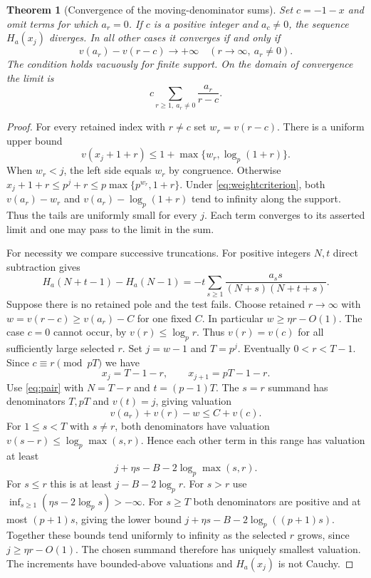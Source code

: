 \documentclass[11pt]{article}
\newtheorem{theorem}{Theorem}[section]
\begin{document}
\begin{theorem}[Convergence of the moving-denominator sums]\label{th:aux}
Set $c=-1-x$ and omit terms for which $a_r=0$. If $c$ is a positive
integer and $a_c\ne0$, the sequence $H_a(x_j)$ diverges.
In all other cases it converges if and only if
\begin{equation}\label{eq:weightcriterion}
              v(a_r)-v(r-c)\longrightarrow+\infty
              \quad(r\longrightarrow\infty,\ a_r\ne0).
\end{equation}
The condition holds vacuously for finite support. On the domain of
convergence the limit is
\[
                 c\sum_{r\ge1,\ a_r\ne0}\frac{a_r}{r-c}.
\]
\end{theorem}
\begin{proof}
For every retained index with $r\ne c$ set $w_r=v(r-c)$. There is a uniform upper bound
\begin{equation}\label{eq:denom}
                 v(x_j+1+r)\le 1+\max\{w_r,\log_p(1+r)\}.
\end{equation}
When $w_r<j$, the left side equals $w_r$ by congruence. Otherwise $x_j+1+r\le p^j+r\le p\max\{p^{w_r},1+r\}$. Under \eqref{eq:weightcriterion}, both $v(a_r)-w_r$ and $v(a_r)-\log_p(1+r)$ tend to infinity along the support. Thus the tails are uniformly small for every $j$. Each term converges to its asserted limit and one may pass to the limit in the sum.

For necessity we compare successive truncations. For positive integers $N,t$ direct subtraction gives
\begin{equation}\label{eq:pair}
 H_a(N+t-1)-H_a(N-1)=-t\sum_{s\ge1}\frac{a_s s}{(N+s)(N+t+s)}.
\end{equation}
Suppose there is no retained pole and the test fails. Choose retained
$r\to\infty$ with $w=v(r-c)\ge v(a_r)-C$ for one fixed $C$. In particular $w\ge\eta r-O(1)$. The case $c=0$ cannot occur, by $v(r)\le\log_p r$. Thus $v(r)=v(c)$ for all sufficiently large selected $r$.
Set $j=w-1$ and $T=p^j$. Eventually $0<r<T-1$. Since $c\equiv r\pmod{pT}$ we have
\[
               x_j=T-1-r,\qquad x_{j+1}=pT-1-r .
\]
Use \eqref{eq:pair} with $N=T-r$ and $t=(p-1)T$. The $s=r$ summand has denominators $T,pT$ and $v(t)=j$, giving valuation
\begin{equation}\label{eq:badterm}
              v(a_r)+v(r)-w\le C+v(c).
\end{equation}
For $1\le s<T$ with $s\ne r$, both denominators have valuation
$v(s-r)\le\log_p\max(s,r)$. Hence each other term in this range has valuation at least
\[
                 j+\eta s-B-2\log_p\max(s,r).
\]
For $s\le r$ this is at least $j-B-2\log_p r$. For $s>r$ use
$\inf_{s\ge1}(\eta s-2\log_p s)>-\infty$. For $s\ge T$ both
denominators are positive and at most $(p+1)s$, giving the lower bound
$j+\eta s-B-2\log_p((p+1)s)$. Together these bounds tend uniformly to
infinity as the selected $r$ grows, since $j\ge\eta r-O(1)$.
The chosen summand therefore has uniquely smallest valuation. The
increments have bounded-above valuations and $H_a(x_j)$ is not Cauchy.


\end{proof}
\end{document}
